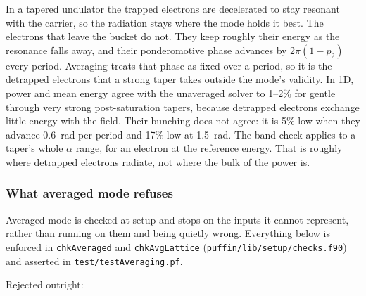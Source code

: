 \documentclass[12pt]{article}%
\begin{document}
In a tapered undulator the trapped electrons are decelerated to stay resonant with the carrier, so the radiation stays where the mode holds it best. The electrons that leave the bucket do not. They keep roughly their energy as the resonance falls away, and their ponderomotive phase advances by $2\pi(1 - p_2)$ every period. Averaging treats that phase as fixed over a period, so it is the detrapped electrons that a strong taper takes outside the mode's validity. In 1D, power and mean energy agree with the unaveraged solver to 1--2\% for gentle through very strong post-saturation tapers, because detrapped electrons exchange little energy with the field. Their bunching does not agree: it is 5\% low when they advance 0.6~rad per period and 17\% low at 1.5~rad. The band check applies to a taper's whole $\alpha$ range, for an electron at the reference energy. That is roughly where detrapped electrons radiate, not where the bulk of the power is.

\subsubsection{What averaged mode refuses}

\label{puff-avg-refuses}

Averaged mode is checked at setup and stops on the inputs it cannot represent, rather than running on them and being quietly wrong. Everything below is enforced in {\tt chkAveraged} and {\tt chkAvgLattice} ({\tt puffin/lib/setup/checks.f90}) and asserted in {\tt test/testAveraging.pf}.

Rejected outright:
\end{document}
